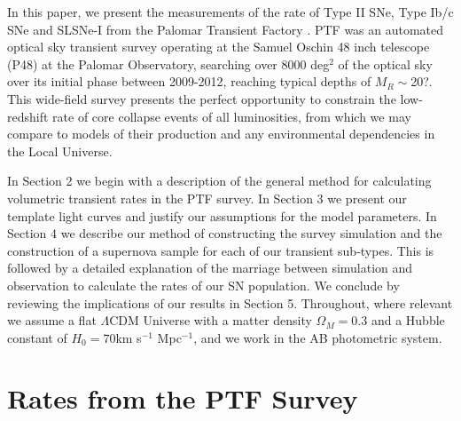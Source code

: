 \documentclass[a4paper,fleqn,usenatbib]{mnras}
\newcommand{\angus}[1]{\color{JungleGreen}#1\color{black}}
\begin{document}
In this paper, we present the measurements of the rate of Type II SNe, Type Ib/c SNe and SLSNe-I from the Palomar Transient Factory \citep[PTF;][]{PTF_REF}. PTF was an automated optical sky transient survey operating at the Samuel Oschin 48 inch telescope (P48) at the Palomar Observatory, searching over 8000 deg$^{2}$ of the optical sky over its initial phase between 2009-2012, reaching typical depths of $M_{R}\sim$\angus{20?}. This wide-field survey presents the perfect opportunity to constrain the low-redshift rate of core collapse events of all luminosities, from which we may compare to models of their production and any environmental dependencies in the Local Universe. 

In Section 2 we begin with a description of the general method for calculating volumetric transient rates in the PTF survey. In Section 3 we present our template light curves and justify our assumptions for the model parameters. In Section 4 we describe our method of constructing the survey simulation and the construction of a supernova sample for each of our transient sub-types. This is followed by a detailed explanation of the marriage between simulation and observation to calculate the rates of our SN population. We conclude by reviewing the implications of our results in Section 5. Throughout, where relevant we assume a flat $\Lambda$CDM Universe with a matter density $\Omega_{M}=0.3$ and a Hubble constant of $H_{0}= 70$km s$^{−1}$ Mpc$^{−1}$, and we work in the AB photometric system.


\section{Rates from the PTF Survey}
\label{sec:ratesPTF}
\end{document}
